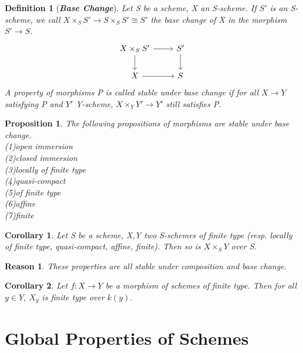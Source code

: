 \documentclass{ctexart}
\newtheorem{definition}{Definition}[section]
\newtheorem{proposition}{Proposition}[section]
\newtheorem{reason}{Reason}[section]
\newtheorem{corollary}{Corollary}[section]
\begin{document}
\begin{definition}[\textbf{\emph{Base Change}}]
    Let S be a scheme, X an S-scheme.
    If $S'$ is an S-scheme, we call $X \times_{S} S' \longrightarrow S \times_{S} S' \cong S'$ the base change of X in the morphism $S' \longrightarrow S$.
    \begin{equation*}
        \begin{tikzcd}
            X \times_{S} S' \arrow[r] \arrow[d] &
            S' \arrow[d] \\
            X \arrow[r] &
            S
        \end{tikzcd}
    \end{equation*}
    A property of morphisms P is called stable under base change if for all $X \longrightarrow Y$ satisfying P and $Y'$ Y-scheme, 
    $X \times_{Y} Y' \longrightarrow Y'$ still satisfies P.  
\end{definition}
\begin{proposition}
    The following propositions of morphisms are stable under base change. \\
    (1)open immersion \\
    (2)closed immersion \\
    (3)locally of finite type \\
    (4)quasi-compact \\
    (5)of finite type \\
    (6)affine \\
    (7)finite
    \label{Proposition 2.10}
\end{proposition}
\begin{corollary}
    Let S be a scheme, X,Y two S-schemes of finite type (resp. locally of finite type, quasi-compact, affine, finite).
    Then so is $X \times_{S} Y$ over S.
    \label{Corollary 2.1}
\end{corollary}
\begin{reason}
    These properties are all stable under composition and base change.
\end{reason}
\begin{corollary}
    Let $f: X \longrightarrow Y$ be a morphism of schemes of finite type.
    Then for all $y\in Y$, $X_{y}$ is finite type over $k(y)$.
    \label{Corollary 2.2}
\end{corollary}

\section{Global Properties of Schemes}
\label{section:Global Properties of Schemes}
\end{document}
